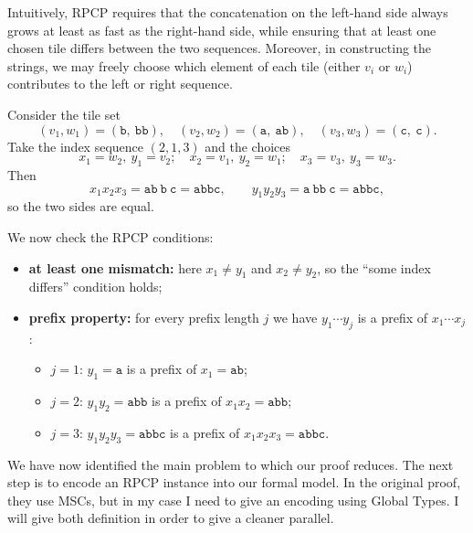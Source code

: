 Intuitively, RPCP requires that the concatenation on the left-hand side always 
grows at least as fast as the right-hand side, while ensuring that at least one 
chosen tile differs between the two sequences. Moreover, in constructing the 
strings, we may freely choose which element of each tile (either $v_i$ or $w_i$) 
contributes to the left or right sequence.

\bigskip

\begin{example}\label{exmp:rpcp}
Consider the tile set
\[
(v_1,w_1)=(\texttt{b},\ \texttt{bb}),\quad
(v_2,w_2)=(\texttt{a},\ \texttt{ab}),\quad
(v_3,w_3)=(\texttt{c},\ \texttt{c}).
\]
Take the index sequence $(2,1,3)$ and the choices
\[
x_1 = w_2,\ y_1 = v_2;\quad
x_2 = v_1,\ y_2 = w_1;\quad
x_3 = v_3,\ y_3 = w_3.
\]
Then
\[
x_1 x_2 x_3 = \texttt{ab}\ \texttt{b}\ \texttt{c} = \texttt{abbc},
\qquad
y_1 y_2 y_3 = \texttt{a}\ \texttt{bb}\ \texttt{c} = \texttt{abbc},
\]
so the two sides are equal.

We now check the RPCP conditions:
\begin{itemize}
  \item \textbf{at least one mismatch:} here $x_1\neq y_1$ and
        $x_2\neq y_2$, so the ``some index differs'' condition holds;
  \item \textbf{prefix property:} for every prefix length $j$ we have
        $y_{1}\cdots y_{j}$ is a prefix of $x_{1}\cdots x_{j}$:
        \begin{itemize}
          \item $j=1$: $y_1=\texttt{a}$ is a prefix of $x_1=\texttt{ab}$;
          \item $j=2$: $y_1y_2=\texttt{abb}$ is a prefix of $x_1x_2=\texttt{abb}$;
          \item $j=3$: $y_1y_2y_3=\texttt{abbc}$ is a prefix of $x_1x_2x_3=\texttt{abbc}$.
        \end{itemize}
\end{itemize}
\end{example}

\bigskip

We have now identified the main problem to which our proof reduces.  
The next step is to encode an RPCP instance into our formal model.
In the original proof, they use MSCs, but in my case I need to give
an encoding using Global Types. I will give both definition in order
to give a cleaner parallel.

\bigskip

